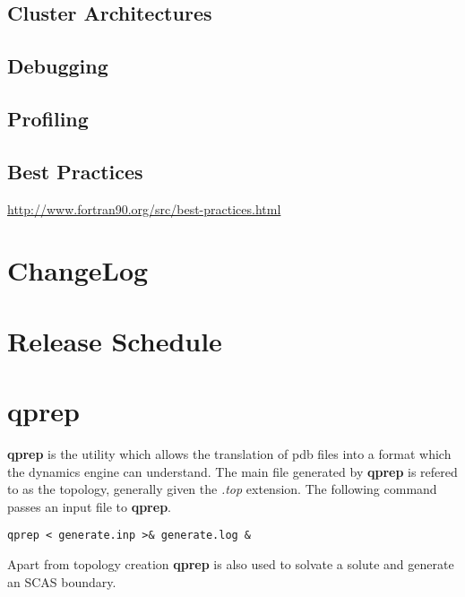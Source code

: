 \documentclass[10pt, oneside, pdftex]{article}
\begin{document}
\subsection{Cluster Architectures}
\label{clusterarchitectures}


\subsection{Debugging}
\label{debugging}


\subsection{Profiling}
\label{profiling}

\subsection{Best Practices}
\label{bestpractices}

\url{http://www.fortran90.org/src/best-practices.html}


\section{ChangeLog}
\label{changelog}


\section{Release Schedule}
\label{schedule}


\section{qprep}
\label{qprep}
\textbf{qprep}  is the  utility which  allows the  translation of  pdb
files into a format which the dynamics engine can understand. The main
file  generated  by \textbf{qprep}  is  refered  to as  the  topology,
generally  given the  \textit{.top} extension.  The following  command
passes an input file to \textbf{qprep}.

\lstset{language=sh, frame=single}
\begin{Verbatim}
qprep < generate.inp >& generate.log &
\end{Verbatim}

Apart from topology creation \textbf{qprep} is also used to solvate a
solute and generate an SCAS boundary.
\end{document}
